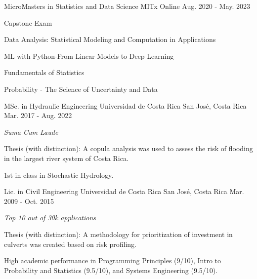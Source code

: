 
\begin{cventries}

  \cventry
    {MicroMasters in Statistics and Data Science} %
    {MITx} %
    {Online} %
    {Aug. 2020 - May. 2023} %
    {
      \begin{cvitems} %
        \item{Capstone Exam}
        \item{Data Analysis: Statistical Modeling and Computation in Applications}
        \item{ML with Python-From Linear Models to Deep Learning}
        \item{Fundamentals of Statistics}
        \item{Probability - The Science of Uncertainty and Data}
      \end{cvitems}
    }

  \cventry
    {MSc. in Hydraulic Engineering} %
    {Universidad de Costa Rica} %
    {San José, Costa Rica} %
    {Mar. 2017 - Aug. 2022} %
    {
      \begin{cvitems} %
        \item{\textit{Suma Cum Laude}}
        \item {Thesis (with distinction): A copula analysis was used to assess the risk of flooding in the largest river system of Costa Rica.}
        \item {1st in class in Stochastic Hydrology.}
      \end{cvitems}
    }

  \cventry
    {Lic. in Civil Engineering} %
    {Universidad de Costa Rica} %
    {San José, Costa Rica} %
    {Mar. 2009 - Oct. 2015} %
    {
      \begin{cvitems} %
        \item{\textit{Top 10 out of 30k applications}}
        \item {Thesis (with distinction): A methodology for prioritization of investment in culverts was created based on risk profiling.}
        \item {High academic performance in Programming Principles (9/10), Intro to Probability and Statistics (9.5/10), and Systems Engineering (9.5/10).}
      \end{cvitems}
    }

\end{cventries}